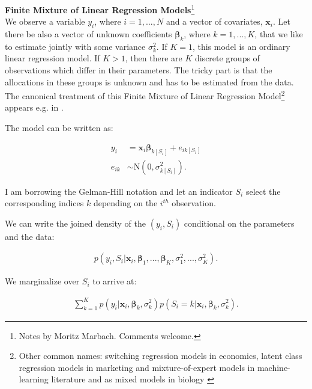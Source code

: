 \documentclass[11pt,a4paper]{article}
\begin{document}
\textbf{Finite Mixture of Linear Regression Models}\footnote{Notes by Moritz Marbach. Comments welcome.} \\

We observe a variable $y_i$, where $i = 1,...,N$ and a vector of covariates, $\mathbf{x}_i$. Let there be also a vector of unknown coefficients $\boldsymbol{\beta}_k$, where $k=1,...,K$, that we like to estimate jointly with some variance $\sigma^2_k$. If $K=1$, this model is an ordinary linear regression model. If $K > 1$, then there are $K$ discrete groups of observations which differ in their parameters. The tricky part is that the allocations in these groups is unknown and has to be estimated from the data. The canonical treatment of this Finite Mixture of Linear Regression Model\footnote{Other common names: switching regression models in economics, latent class regression models in marketing and mixture-of-expert models in machine-learning literature and as mixed models in biology \citet[p. 246]{FruehwirthSchnatter.2006}} appears e.g. in \citet{FruehwirthSchnatter.2006}.

The model can be written as: 

\begin{equation*}
\begin{split}
y_i &= \mathbf{x}_i \bm{\beta}_{k[S_i]} + e_{ik[S_i]} \\
e_{ik} &\sim \mathrm{N}(0,\sigma^2_{k[S_i]}). 
\end{split}
\end{equation*}

I am borrowing the Gelman-Hill notation \citep{Gelman.Hill.2006} and let an indicator $S_i$ select the corresponding indices $k$ depending on the  $i^{th}$ observation.

We can write the joined density of the $(y_i,S_i)$ conditional on the parameters and the data: 

\begin{equation*}
\begin{split}
p(y_i, S_i | \mathbf{x}_i, \bm{\beta}_1,..., \bm{\beta}_K, \sigma^2_1,...,\sigma^2_K ). 
\end{split}
\end{equation*}

We marginalize over $S_i$ to arrive at: 

\begin{equation*}
\begin{split}
\sum_{k=1}^K p(y_i | \mathbf{x}_i, \bm{\beta}_k, \sigma^2_k) p(S_i=k | \mathbf{x}_i, \bm{\beta}_k, \sigma^2_k). 
\end{split}
\end{equation*}
\end{document}
